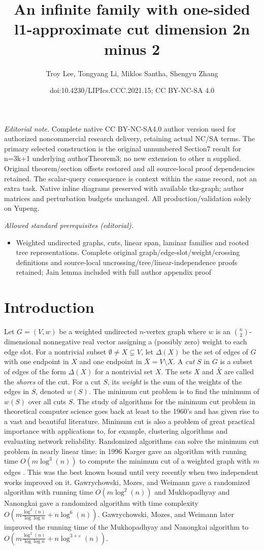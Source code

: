 \documentclass[10pt,a4paper]{article}
\title{An infinite family with one-sided l1-approximate cut dimension 2n minus 2}
\author{Troy Lee, Tongyang Li, Miklos Santha, Shengyu Zhang}
\date{doi:10.4230/LIPIcs.CCC.2021.15; CC BY-NC-SA 4.0}
\newcommand{\1}{\mathbf{1}}
\theoremstyle{definition}
\begin{document}
\maketitle
\noindent\textit{Editorial note.} Complete native CC BY-NC-SA4.0 author version used for authorized noncommercial research delivery, retaining actual NC/SA terms. The primary selected construction is the original unnumbered Section7 result for n=3k+1 underlying authorTheorem3; no new extension to other n supplied. Original theorem/section offsets restored and all source-local proof dependencies retained. The scalar-query consequence is context within the same record, not an extra task. Native inline diagrams preserved with available tkz-graph; author matrices and perturbation budgets unchanged. All production/validation solely on Yupeng.\par\medskip
\noindent\textit{Allowed standard prerequisites (editorial).}\begin{itemize}
\item Weighted undirected graphs, cuts, linear span, laminar families and rooted tree representations. Complete original graph/edge-slot/weight/crossing definitions and source-local uncrossing/tree/linear-independence proofs retained; Jain lemma included with full author appendix proof
\end{itemize}\medskip
\section{Introduction}
Let $G = (V,w)$ be a weighted undirected $n$-vertex graph where $w$ is an $\binom{n}{2}$-dimensional nonnegative real vector assigning a (possibly zero) weight to each edge slot.  For a
nontrivial subset $\emptyset \ne X \subsetneq V$, let $\Delta(X)$ be the set of edges of $G$ with one endpoint in $X$ and one endpoint in $\bar{X} = V \setminus X$.  A \emph{cut} $S$ in $G$ is a subset of edges of the form $\Delta(X)$ for
a nontrivial set $X$.  The sets $X$ and $\bar{X}$ are called the \emph{shores} of the cut.  For a cut $S$, its \emph{weight} is the sum of the weights of the edges in $S$, denoted $w(S)$.
The minimum cut problem is to find the minimum of $w(S)$ over all cuts $S$.  The study of algorithms for the minimum cut
problem in theoretical computer science goes back at least to the 1960's and has given rise to a vast and beautiful literature.
Minimum cut is also a problem of great practical importance with applications
to, for example, clustering algorithms and evaluating network reliability. Randomized algorithms can solve the minimum cut problem in nearly linear time: in 1996 Karger gave an
algorithm with running time $O(m \log^3(n))$ to compute the minimum cut of a weighted graph with $m$ edges \cite{Karger00}.  This was the best known bound until very recently when two independent
works improved on it.  Gawrychowski, Mozes, and Weimann \cite{GMW20} gave a randomized algorithm with running time $O(m\log^2(n))$ \cite{GMW20} and Mukhopadhyay and Nanongkai \cite{MN20} gave a randomized algorithm with time complexity $O(m\frac{\log^2(n)}{\log\log n}+n\log^6(n))$.   Gawrychowski, Mozes, and Weimann \cite{GMW20b} later improved the running time of the Mukhopadhyay and Nanongkai algorithm to $O(m\frac{\log^2(n)}{\log\log n}+n\log^{3+\varepsilon}(n))$.
\end{document}
